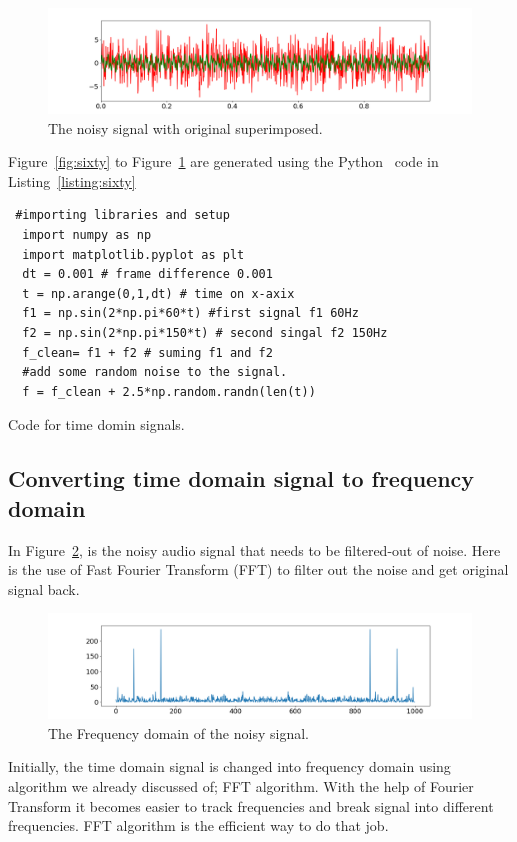 \documentclass[a4paper, 12pt]{scrartcl}
\begin{document}
\begin{figure}[H] 
  \centering
  \includegraphics[width=\textwidth]{img/original_noisy.png}
  \caption{The noisy signal with original superimposed.}
  \label{fig:original_noisy}
\end{figure}

Figure~\ref{fig:sixty} to Figure~\ref{fig:original_noisy} are generated using the Python~\cite{fftnumpy} code in Listing~\ref{listing:sixty}

\begin{listing}[h]
  \begin{verbatim}
 #importing libraries and setup
  import numpy as np
  import matplotlib.pyplot as plt
  dt = 0.001 # frame difference 0.001
  t = np.arange(0,1,dt) # time on x-axix
  f1 = np.sin(2*np.pi*60*t) #first signal f1 60Hz
  f2 = np.sin(2*np.pi*150*t) # second singal f2 150Hz
  f_clean= f1 + f2 # suming f1 and f2
  #add some random noise to the signal.
  f = f_clean + 2.5*np.random.randn(len(t))
  \end{verbatim}
  \caption{Code for time domin signals.}
  \label{listing:sixty}
  \end{listing}
  
\subsection{Converting time domain signal to frequency domain}

  In Figure~\ref{fig:time_to_freq}, is the noisy audio signal that needs to be filtered-out of noise.
Here is the use of Fast Fourier Transform (FFT) to filter out the noise and get original signal back.
  
\begin{figure}[H] 
  \centering
  \includegraphics[width=\textwidth]{img/time_to_freq.png}
  \caption{The Frequency domain of the noisy signal.}
  \label{fig:time_to_freq}
\end{figure}
Initially, the time domain signal is changed into frequency domain using algorithm we already discussed of; FFT algorithm.
With the help of Fourier Transform it becomes easier to track frequencies and break signal into different frequencies.
FFT algorithm is the efficient way to do that job.
\end{document}
